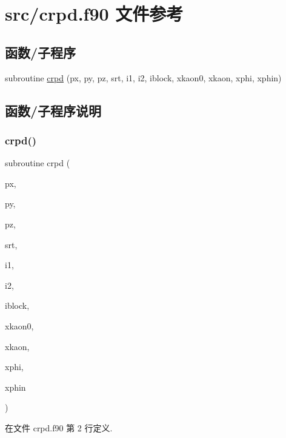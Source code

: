 \hypertarget{crpd_8f90}{}\section{src/crpd.f90 文件参考}
\label{crpd_8f90}
\subsection*{函数/子程序}
\begin{DoxyCompactItemize}
\item 
subroutine \mbox{\hyperlink{crpd_8f90_af91d6b16716eca83867b47e1dac207ef}{crpd}} (px, py, pz, srt, i1, i2, iblock, xkaon0, xkaon, xphi, xphin)
\end{DoxyCompactItemize}


\subsection{函数/子程序说明}
\mbox{\label{crpd_8f90_af91d6b16716eca83867b47e1dac207ef}} 
\subsubsection{\texorpdfstring{crpd()}{crpd()}}
{\footnotesize\ttfamily subroutine crpd (\begin{DoxyParamCaption}\item[{}]{px,  }\item[{}]{py,  }\item[{}]{pz,  }\item[{}]{srt,  }\item[{}]{i1,  }\item[{}]{i2,  }\item[{}]{iblock,  }\item[{}]{xkaon0,  }\item[{}]{xkaon,  }\item[{}]{xphi,  }\item[{}]{xphin }\end{DoxyParamCaption})}



在文件 crpd.\+f90 第 2 行定义.


